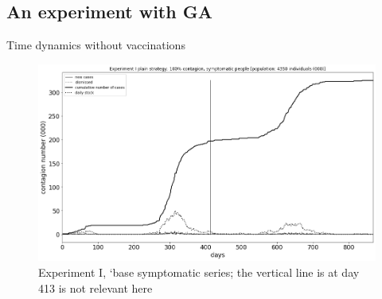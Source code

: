 \documentclass[9pt]{beamer}
\begin{document}
\subsection{An experiment with GA}

\begin{frame}{Time dynamics without vaccinations}

\begin{figure}[H]
\center
\includegraphics[scale=0.16]{Experiment_I_base_symptomatic_series.png} 

\caption{Experiment I, `base symptomatic series; the vertical line is at day 413 is not relevant here} 
\label{Experiment_I_plainSymptomaticSeries}
\end{figure}


\end{frame}

\end{document}
